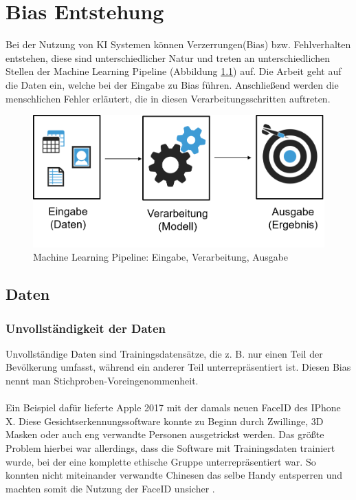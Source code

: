 \documentclass[12pt,oneside,a4paper,parskip]{scrbook}
\begin{document}
\chapter{Bias Entstehung}
\label{chapter:BiasEntstehung}
Bei der Nutzung von KI Systemen können Verzerrungen(Bias) bzw. Fehlverhalten entstehen, diese sind unterschiedlicher Natur und treten an unterschiedlichen Stellen der Machine Learning Pipeline (Abbildung \ref{fig:dataBias}) auf. Die Arbeit geht auf die Daten ein, welche bei der Eingabe zu Bias führen. Anschließend werden die menschlichen Fehler erläutert, die in diesen Verarbeitungsschritten auftreten.

\begin{figure}[h]
	\begin{center}
		\includegraphics[width=12cm]{Bilder/data_bias.png}
		\caption{Machine Learning Pipeline: Eingabe, Verarbeitung, Ausgabe}
		\label{fig:dataBias}
	\end{center}
\end{figure}

\section{Daten}
\label{section:data}
\subsection{Unvollständigkeit der Daten}
\label{section:uncompleteData}
Unvollständige Daten sind Trainingsdatensätze, die z. B. nur einen Teil der Bevölkerung umfasst, während ein anderer Teil unterrepräsentiert ist. Diesen Bias nennt man Stichproben-Voreingenommenheit.
\\\\
Ein Beispiel dafür lieferte Apple 2017 mit der damals neuen FaceID des IPhone X.
Diese Gesichtserkennungssoftware konnte zu Beginn durch Zwillinge, 3D Masken oder auch eng verwandte Personen ausgetrickst werden. Das größte Problem hierbei war allerdings, dass die Software mit Trainingsdaten trainiert wurde, bei der eine komplette ethische Gruppe unterrepräsentiert war. So konnten nicht miteinander verwandte Chinesen das selbe Handy entsperren und machten somit die Nutzung der FaceID unsicher \cite{iphone}.
\end{document}
